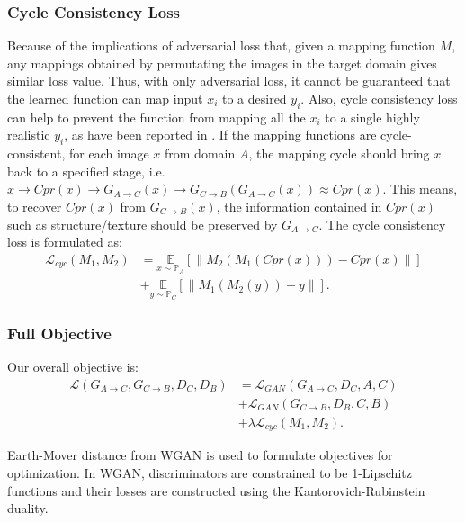 \documentclass[10pt,conference,a4paper]{IEEEtran}
\begin{document}
\subsubsection{Cycle Consistency Loss}
Because of the implications of adversarial loss that, given a mapping function $M$, any mappings obtained by permutating the images in the target domain gives similar loss value. Thus, with only adversarial loss, it cannot be guaranteed that the learned function can map input $x_i$ to a desired $y_i$.
Also, cycle consistency loss can help to prevent the function from mapping all the $x_i$ to a single highly realistic $y_i$, as have been reported in \cite{traingan2016}. If the mapping functions are cycle-consistent, for each image $x$ from domain $A$, the mapping cycle should bring $x$ back to a specified stage, i.e. $x\rightarrow Cpr(x) \rightarrow G_{A\rightarrow C}(x) \rightarrow G_{C\rightarrow B}(G_{A\rightarrow C}(x)) \approx Cpr(x)$. This means, to recover $Cpr(x)$ from $G_{C\rightarrow B}(x)$, the information contained in $Cpr(x)$ such as structure/texture should be preserved by $G_{A\rightarrow C}$. The cycle consistency loss is formulated as:
\begin{equation}\label{eq:cycleloss}
\begin{aligned}
  \mathcal{L}_{cyc}(M_1,M_2)&=\underset{x\sim \mathbb{P}_A}{\mathbb{E}} [\| M_2(M_1(Cpr(x)))-Cpr(x) \|] \\
  &+\underset{y\sim \mathbb{P}_C}{\mathbb{E}} [\|M_1(M_2(y))-y\|].
\end{aligned}
\end{equation}

\subsubsection{Full Objective}
Our overall objective is:
\begin{equation}\label{eq:objective}
\begin{aligned}
    \mathcal{L}(G_{A\rightarrow C},G_{C\rightarrow B},D_C,D_B)&=\mathcal{L}_{GAN}(G_{A\rightarrow C},D_C,A,C)\\
    &+\mathcal{L}_{GAN}(G_{C\rightarrow B},D_B,C,B)\\
    &+\lambda \mathcal{L}_{cyc}(M_1,M_2).
\end{aligned}
\end{equation}

Earth-Mover distance from WGAN \cite{wgan} is used to formulate objectives for optimization. In WGAN, discriminators are constrained to be 1-Lipschitz functions and their losses are constructed using the Kantorovich-Rubinstein duality.%
\end{document}
